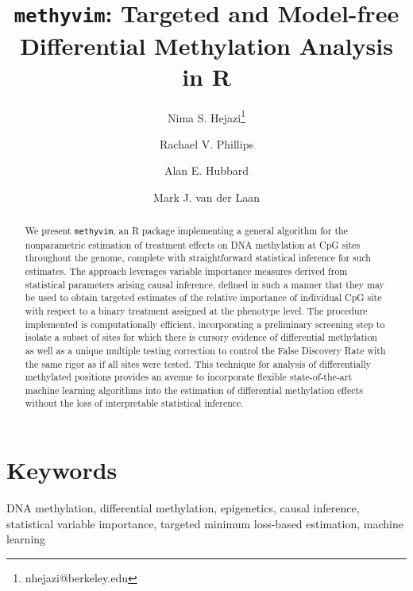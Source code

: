\documentclass[9pt,a4paper,]{extarticle}
\theoremstyle{definition}
\theoremstyle{definition}
\theoremstyle{definition}
\theoremstyle{remark}
\begin{document}
\pagestyle{front}

\title{\texttt{methyvim}: Targeted and Model-free Differential Methylation Analysis in R}

\author[1,2]{Nima S. Hejazi\thanks{\ttfamily nhejazi@berkeley.edu}}
\author[1]{Rachael V. Phillips}
\author[1]{Alan E. Hubbard}
\author[1,3]{Mark J. van der Laan}

\maketitle
\thispagestyle{front}

\begin{abstract}
We present \texttt{methyvim}, an R package implementing a general algorithm for the
nonparametric estimation of treatment effects on DNA methylation at CpG sites
throughout the genome, complete with straightforward statistical inference for
such estimates. The approach leverages variable importance measures derived
from statistical parameters arising causal inference, defined in such a manner
that they may be used to obtain targeted estimates of the relative importance
of individual CpG site with respect to a binary treatment assigned at the
phenotype level. The procedure implemented is computationally efficient,
incorporating a preliminary screening step to isolate a subset of sites for
which there is cursory evidence of differential methylation as well as a
unique multiple testing correction to control the False Discovery Rate with
the same rigor as if all sites were tested. This technique for analysis of
differentially methylated positions provides an avenue to incorporate flexible
state-of-the-art machine learning algorithms into the estimation of
differential methylation effects without the loss of interpretable statistical
inference.
\end{abstract}

\section*{Keywords}
DNA methylation, differential methylation, epigenetics, causal inference, statistical variable importance, targeted minimum loss-based estimation, machine learning


\clearpage
\pagestyle{main}
\end{document}
